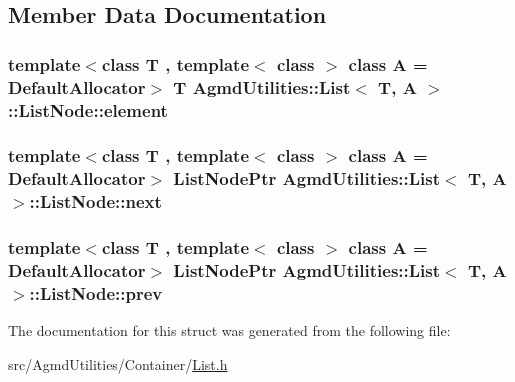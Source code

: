 \subsection{Member Data Documentation}
\hypertarget{struct_agmd_utilities_1_1_list_1_1_list_node_aec5ea78bee50e2a776753148e709353d}{
\subsubsection[{element}]{\setlength{\rightskip}{0pt plus 5cm}template$<$class T , template$<$ class $>$ class A = Default\+Allocator$>$ T {\bf Agmd\+Utilities\+::\+List}$<$ T, A $>$\+::List\+Node\+::element}}\label{struct_agmd_utilities_1_1_list_1_1_list_node_aec5ea78bee50e2a776753148e709353d}
\hypertarget{struct_agmd_utilities_1_1_list_1_1_list_node_ac267accf962da56f1c76b7e2f88cca33}{
\subsubsection[{next}]{\setlength{\rightskip}{0pt plus 5cm}template$<$class T , template$<$ class $>$ class A = Default\+Allocator$>$ {\bf List\+Node\+Ptr} {\bf Agmd\+Utilities\+::\+List}$<$ T, A $>$\+::List\+Node\+::next}}\label{struct_agmd_utilities_1_1_list_1_1_list_node_ac267accf962da56f1c76b7e2f88cca33}
\hypertarget{struct_agmd_utilities_1_1_list_1_1_list_node_aeca4057e42c540101b808c2c745a21f7}{
\subsubsection[{prev}]{\setlength{\rightskip}{0pt plus 5cm}template$<$class T , template$<$ class $>$ class A = Default\+Allocator$>$ {\bf List\+Node\+Ptr} {\bf Agmd\+Utilities\+::\+List}$<$ T, A $>$\+::List\+Node\+::prev}}\label{struct_agmd_utilities_1_1_list_1_1_list_node_aeca4057e42c540101b808c2c745a21f7}


The documentation for this struct was generated from the following file\+:\begin{DoxyCompactItemize}
\item 
src/\+Agmd\+Utilities/\+Container/\hyperlink{_agmd_utilities_2_container_2_list_8h}{List.\+h}\end{DoxyCompactItemize}
